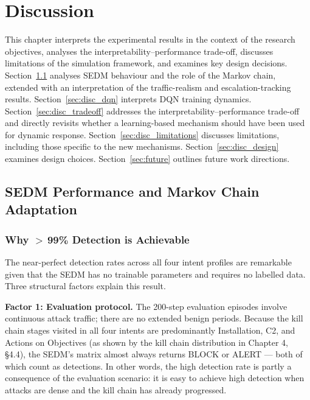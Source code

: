 \chapter{Discussion}
\label{ch:discussion}

This chapter interprets the experimental results in the context of the
research objectives, analyses the interpretability--performance trade-off,
discusses limitations of the simulation framework, and examines key
design decisions.
Section~\ref{sec:disc_sedm} analyses SEDM behaviour and the role of the
Markov chain, extended with an interpretation of the traffic-realism and
escalation-tracking results.
Section~\ref{sec:disc_dqn} interprets DQN training dynamics.
Section~\ref{sec:disc_tradeoff} addresses the interpretability--performance
trade-off and directly revisits whether a learning-based mechanism should
have been used for dynamic response.
Section~\ref{sec:disc_limitations} discusses limitations, including those
specific to the new mechanisms.
Section~\ref{sec:disc_design} examines design choices.
Section~\ref{sec:future} outlines future work directions.

\section{SEDM Performance and Markov Chain Adaptation}
\label{sec:disc_sedm}

\subsection{Why $>$\,99\% Detection is Achievable}

The near-perfect detection rates across all four intent profiles are
remarkable given that the SEDM has no trainable parameters and requires
no labelled data.
Three structural factors explain this result.

\textbf{Factor 1: Evaluation protocol.}
The 200-step evaluation episodes involve continuous attack traffic; there
are no extended benign periods.
Because the kill chain stages visited in all four intents are predominantly
Installation, C2, and Actions on Objectives (as shown by the kill chain
distribution in Chapter 4, \S4.4), the SEDM's matrix almost always returns
BLOCK or ALERT --- both of which count as detections.
In other words, the high detection rate is partly a consequence of the
evaluation scenario: it is easy to achieve high detection when attacks are
dense and the kill chain has already progressed.


